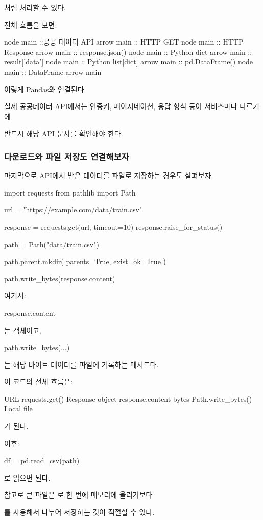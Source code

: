 처럼 처리할 수 있다.

전체 흐름을 보면:

\begin{dhkbranch}[in=12]
node main ::공공 데이터 API
arrow main :: HTTP GET
node main :: HTTP Response
arrow main :: response.json()
node main :: Python dict
arrow main :: result['data']
node main :: Python list[dict]
arrow main :: pd.DataFrame()
node main :: DataFrame
arrow main
\end{dhkbranch}

이렇게 Pandas와 연결된다.

실제 공공데이터 API에서는 인증키, 페이지네이션, 응답 형식 등이 서비스마다 다르기에

반드시 해당 API 문서를 확인해야 한다.

\subsubsection{다운로드와 파일 저장도 연결해보자}

마지막으로 API에서 받은 데이터를 파일로 저장하는 경우도 살펴보자.

\begin{dhkcode}
import requests
from pathlib import Path

url = "https://example.com/data/train.csv"

response = requests.get(url, timeout=10)
response.raise_for_status()

path = Path("data/train.csv")

path.parent.mkdir(
    parents=True,
    exist_ok=True
)

path.write_bytes(response.content)
\end{dhkcode}

여기서:

\begin{dhkcode}
response.content
\end{dhkcode}

는  객체이고,

\begin{dhkcode}
path.write_bytes(...)
\end{dhkcode}

는 해당 바이트 데이터를 파일에 기록하는 메서드다.

이 코드의 전체 흐름은:

\begin{dhksmry}[centered]
URL
\da
requests.get()
\da
Response object
\da
response.content
\da
bytes
\da
Path.write_bytes()
\da
Local file
\end{dhksmry}

가 된다.

이후:

\begin{dhkcode}
df = pd.read_csv(path)
\end{dhkcode}

로 읽으면 된다.

참고로 큰 파일은 로 한 번에 메모리에 올리기보다

를 사용해서 나누어 저장하는 것이 적절할 수 있다.
